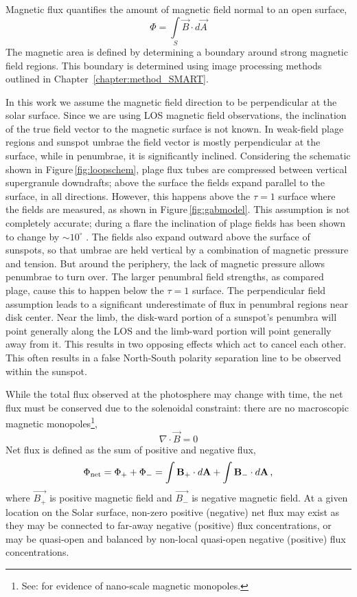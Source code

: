 Magnetic flux quantifies the amount of magnetic field normal to an open surface,
\begin{equation}
\Phi = \int\limits_S \vec{B} \cdot d\vec{A}  
\end{equation}
The magnetic area is defined by determining a boundary around strong magnetic field regions. This boundary is determined using image processing methods outlined in Chapter~\ref{chapter:method_SMART}.

In this work we assume the magnetic field direction to be perpendicular at the solar surface. Since we are using \gls{LOS} magnetic field observations, the inclination of the true field vector to the magnetic surface is not known. In weak-field plage regions and sunspot umbrae the field vector is mostly perpendicular at the surface, while in penumbrae, it is significantly inclined. Considering the schematic shown in Figure\,\ref{fig:loopschem}, plage flux tubes are compressed between vertical supergranule downdrafts; above the surface the fields expand parallel to the surface, in all directions. However, this happens above the $\tau=1$ surface where the fields are measured, as shown in Figure\,\ref{fig:gabmodel}. This assumption is not completely accurate; during a flare the inclination of plage fields has been shown to change by $\sim$$10^{\circ}$ \citep{Murray:2012}. The fields also expand outward above the surface of sunspots, so that umbrae are held vertical by a combination of magnetic pressure and tension. But around the periphery, the lack of magnetic pressure allows penumbrae to turn over. The larger penumbral field strengths, as compared plage, cause this to happen below the $\tau=1$ surface. The perpendicular field assumption leads to a significant underestimate of flux in penumbral regions near disk center. Near the limb,  the disk-ward portion of a sunspot's penumbra will point generally along the LOS and the limb-ward portion will point generally away from it. This results in two opposing effects which act to cancel each other. This often results in a false North-South polarity separation line to be observed within the sunspot.

While the total flux observed at the photosphere may change with time, the net flux must be conserved due to the solenoidal constraint: there are no macroscopic magnetic monopoles\footnote{See: \citet{Mengotti:2010} for evidence of nano-scale magnetic monopoles.},
\begin{equation}\label{eqn_gauss_law}
\nabla\cdot\vec{B}=0  
\end{equation}
Net flux is defined as the sum of positive and negative flux,
\begin{equation}
\Phi_{\mathrm{net}}=\Phi_{+}+\Phi_{-}=\int{\vec{B_{+}}\cdot d\vec{A}} + \int{\vec{B_{-}}\cdot d\vec{A}} \mbox{\,,}
\end{equation}
where $\vec{B_{+}}$ is positive magnetic field and $\vec{B_{-}}$ is negative magnetic field. At a given location on the Solar surface, non-zero positive (negative) net flux may exist as they may be connected to far-away negative (positive) flux concentrations, or may be quasi-open and balanced by non-local quasi-open negative (positive) flux concentrations.


